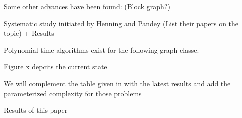 Some other advances have been found: (Block graph?)

Systematic study initiated by Henning and Pandey (List their papers on the topic) + Results

Polynomial time algorithms exist for the following graph classe.

Figure x depcits the current state

We will complement the table given in \cite{Galby2020} with the latest results and add the parameterized complexity for those problems


Results of this paper

\begin{center}
    
\end{center}
